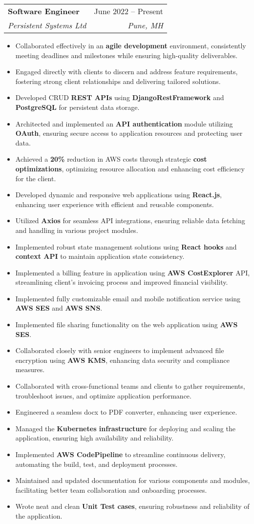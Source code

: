 \documentclass[letterpaper,11pt]{article}
\makeatletter
\newcommand{\resumeItem}[1]{
  \item\small{
    {#1 \vspace{2pt}}
  }
}
\newcommand{\resumeSubheading}[4]{
  \vspace{1pt}\item
    \begin{tabular*}{0.97\textwidth}[t]{l@{\extracolsep{\fill}}r}
      \textbf{#1} & #2 \\
      \textit{\large#3} & \textit{\large #4} \\
    \end{tabular*}\vspace{-7pt}
}
\newcommand{\resumeItemListStart}{\begin{itemize}}
\newcommand{\resumeItemListEnd}{\end{itemize}\vspace{-2pt}}
\makeatother
\begin{document}
    \resumeSubheading
      {Software Engineer}{June 2022 -- Present}
      {Persistent Systems Ltd}{Pune, MH}
      \resumeItemListStart
        \resumeItem{Collaborated effectively in an \textbf{agile development} environment, consistently meeting deadlines and milestones while ensuring high-quality deliverables.}
        \resumeItem{Engaged directly with clients to discern and address feature requirements, fostering strong client relationships and delivering tailored solutions.}
        \resumeItem{Developed CRUD \textbf{REST APIs} using \textbf{DjangoRestFramework} and \textbf{PostgreSQL} for persistent data storage.}
        \resumeItem{Architected and implemented an \textbf{API authentication} module utilizing \textbf{OAuth}, ensuring secure access to application resources and protecting user data.}
        \resumeItem{Achieved a \textbf{20\%} reduction in AWS costs through strategic \textbf{cost optimizations}, optimizing resource allocation and enhancing cost efficiency for the client.}
        \resumeItem{Developed dynamic and responsive web applications using \textbf{React.js}, enhancing user experience with efficient and reusable components.}
        \resumeItem{Utilized \textbf{Axios} for seamless API integrations, ensuring reliable data fetching and handling in various project modules.}
        \resumeItem{Implemented robust state management solutions using \textbf{React hooks} and \textbf{context API} to maintain application state consistency.}
        \resumeItem{Implemented a billing feature in application using \textbf{AWS CostExplorer} API, streamlining client's invoicing process and improved financial visibility.}
        \resumeItem{Implemented fully customizable email and mobile notification service using \textbf{AWS SES} and \textbf{AWS SNS}.}
        \resumeItem{Implemented file sharing functionality on the web application using \textbf{AWS SES}.}
        \resumeItem{Collaborated closely with senior engineers to implement advanced file encryption using \textbf{AWS KMS}, enhancing data security and compliance measures.}
        \resumeItem{Collaborated with cross-functional teams and clients to gather requirements, troubleshoot issues, and optimize application performance.}
        \resumeItem{Engineered a seamless docx to PDF converter, enhancing user experience.}
        \resumeItem{Managed the \textbf{Kubernetes infrastructure} for deploying and scaling the application, ensuring high availability and reliability.}
        \resumeItem{Implemented \textbf{AWS CodePipeline} to streamline continuous delivery, automating the build, test, and deployment processes.}
        \resumeItem{Maintained and updated documentation for various components and modules, facilitating better team collaboration and onboarding processes.}
        \resumeItem{Wrote neat and clean \textbf{Unit Test cases}, ensuring robustness and reliability of the application.}
      \resumeItemListEnd
    
\end{document}
